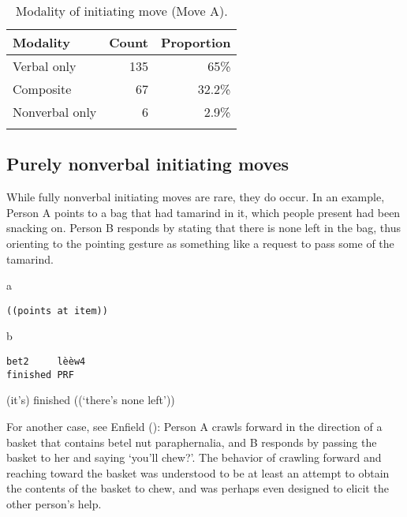 \documentclass[output=paper]{langsci/langscibook}
\begin{document}
\begin{table}
\begin{tabularx}{0.66\textwidth}{Xrr}
\lsptoprule
Modality & Count & Proportion\\
\midrule
Verbal only & 135 & 65\%\\
Composite & 67 & 32.2\%\\
Nonverbal only & 6 & 2.9\%\\
\lspbottomrule
\end{tabularx}
\caption{Modality of initiating move (Move A).}
\label{tab:enfield:2}
\end{table}

\subsection{Purely nonverbal initiating moves}

While fully nonverbal initiating moves are rare, they do occur. In an example, Person A points to a bag that had tamarind in it, which people present had been snacking on. Person B responds by stating that there is none left in the bag, thus orienting to the pointing gesture as something like a request to pass some of the tamarind.

\vspace{-1mm}
%
\begin{mdframednoverticalspace}[style=firstfoc]
\begin{transbox}{1}{a}
\begin{verbatim}
((points at item))
\end{verbatim}
\end{transbox}
\end{mdframednoverticalspace}\vspace{-2mm}
%
\begin{mdframednoverticalspace}[style=secondfoc]
\begin{transbox}{2}{b}
\begin{verbatim}
bet2     lèèw4
finished PRF
\end{verbatim}
(it’s) finished ((‘there’s none left’))
\end{transbox}
\end{mdframednoverticalspace}\bigskip

For another case, see Enfield (\citeyear[19--21, 46]{Enfield2013}): Person A crawls forward in the direction of a basket that contains betel nut paraphernalia, and B responds by passing the basket to her and saying ‘you’ll chew?’. The behavior of crawling forward and reaching toward the basket was understood to be at least an attempt to obtain the contents of the basket to chew, and was perhaps even designed to elicit the other person’s help.
\end{document}
